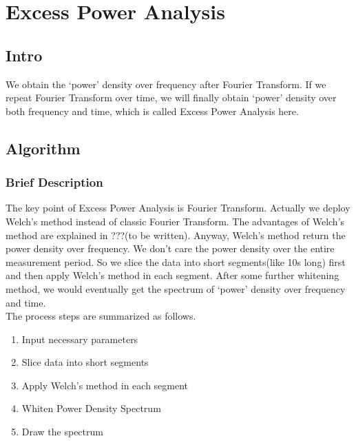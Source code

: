 \documentclass[
12pt, %
a4paper %
]{extreport}
\theoremstyle{plain}
\begin{document}
\chapter{Excess Power Analysis}
\section{Intro}
We obtain the `power' density over frequency after Fourier Transform. If we repeat Fourier Transform over time, we will finally obtain `power' density over both frequency and time, which is called Excess Power Analysis here. 
\section{Algorithm}
\subsection{Brief Description}
The key point of Excess Power Analysis is Fourier Transform. Actually we deploy Welch’s method instead of classic Fourier Transform. The advantages of Welch’s method are explained in ???(to be written). Anyway, Welch’s method return the power density over frequency. 
We don't care the power density over the entire measurement period. So we slice the data into short segments(like 10s long) first and then apply Welch’s method in each segment. After some further whitening method, we would eventually get the spectrum of `power' density over frequency and time. \\
The process steps are summarized as follows. 
\begin{enumerate}
\item Input necessary parameters
\item Slice data into short segments
\item Apply Welch’s method in each segment 
\item Whiten Power Density Spectrum
\item Draw the spectrum
\end{enumerate}
\end{document}
